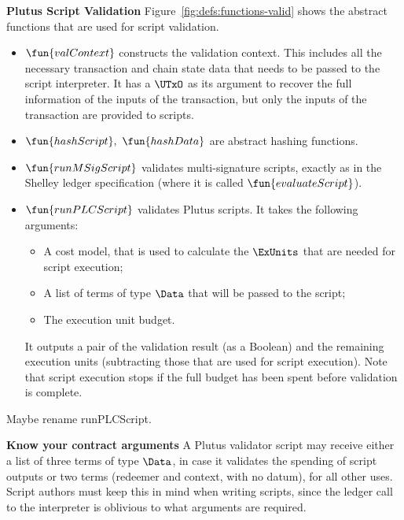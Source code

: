 \textbf{Plutus Script Validation}
Figure~\ref{fig:defs:functions-valid} shows the abstract functions that are used for script validation.

\begin{itemize}
\item
  $\fun{valContext}$ constructs the validation context.
  This includes all the necessary transaction and chain state data that needs to be passed to the script interpreter.
    It has a $\UTxO$ as its argument to recover the full information of the inputs of the transaction,
    but only the inputs of the transaction are provided to scripts.
\item
    $\fun{hashScript},~ \fun{hashData}$ are abstract hashing functions.
\item
  $\fun{runMSigScript}$ validates multi-signature scripts, exactly as in the Shelley ledger specification (where it is called $\fun{evaluateScript}$).
\item
  $\fun{runPLCScript}$ validates Plutus scripts. It takes the following
  arguments:
  \begin{itemize}
  \item A cost model, that is used to calculate the $\ExUnits$ that are needed for script execution;
  \item A list of terms of type $\Data$ that will be passed to the script; %
  \item The execution unit budget.
  \end{itemize}
  It outputs a pair of the validation result (as a Boolean)
  and the remaining execution units (subtracting those that are used for script execution).
  Note that script execution stops if the full budget has been spent before validation is complete.
\end{itemize}
\begin{note}
  Maybe rename runPLCScript.
\end{note}

\begin{note}
  \textbf{Know your contract arguments}
  A Plutus validator script may receive either a list of three terms of type $\Data$, in case it validates the spending of script outputs
  or two terms (redeemer and context, with no datum), for all other uses.
  Script authors must keep this in mind when writing scripts, since the ledger call to the interpreter is oblivious to what
  arguments are required.
\end{note}

